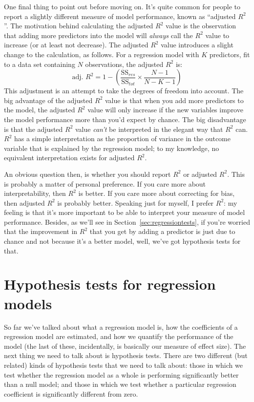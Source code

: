
One final thing to point out before moving on. It's quite common for people to report a slightly different measure of model performance, known as ``adjusted $R^2$''. The motivation behind calculating the adjusted $R^2$ value is the observation that adding more predictors into the model will {\it always} call the $R^2$ value to increase (or at least not decrease). The adjusted $R^2$ value introduces a slight change to the calculation, as follows. For a regression model with $K$ predictors, fit to a data set containing $N$ observations, the adjusted $R^2$ is:
$$
\mbox{adj. } R^2 = 1 - \left(\frac{\mbox{SS}_{res}}{\mbox{SS}_{tot}} \times \frac{N-1}{N-K-1} \right)
$$
This adjustment is an attempt to take the degrees of freedom into account. The big advantage of the adjusted $R^2$ value is that when you add more predictors to the model, the adjusted $R^2$ value will only increase if the new variables improve the model performance more than you'd expect by chance. The big disadvantage is that the adjusted $R^2$ value {\it can't} be interpreted in the elegant way that $R^2$ can. $R^2$ has a simple interpretation as the proportion of variance in the outcome variable that is explained by the regression model; to my knowledge, no equivalent interpretation exists for adjusted $R^2$. 

An obvious question then, is whether you should report $R^2$ or adjusted $R^2$. This is probably a matter of personal preference. If you care more about interpretability, then $R^2$ is better. If you care more about correcting for bias, then adjusted $R^2$ is probably better. Speaking just for myself, I prefer $R^2$: my feeling is that it's more important to be able to interpret your measure of model performance. Besides, as we'll see in Section~\ref{sec:regressiontests}, if you're worried that the improvement in $R^2$ that you get by adding a predictor is just due to chance and not because it's a better model, well, we've got hypothesis tests for that. 






\section{Hypothesis tests for regression models~\label{sec:regressiontests}}

So far we've talked about what a regression model is, how the coefficients of a regression model are estimated, and how we quantify the performance of the model (the last of these, incidentally, is basically our measure of effect size). The next thing we need to talk about is hypothesis tests. There are two different (but related) kinds of hypothesis tests that we need to talk about: those in which we test whether the regression model as a whole is performing significantly better than a null model; and those in which we test whether a particular regression coefficient is significantly different from zero. 

